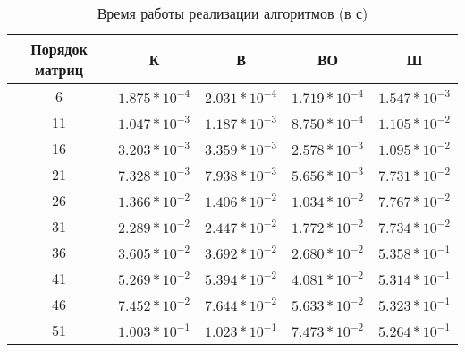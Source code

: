 \begin{table}[h]
	\begin{center}
		\begin{threeparttable}
			\captionsetup{justification=raggedright,singlelinecheck=off}
			\caption{Время работы реализации алгоритмов (в с)}
			\label{tbl:time_measurements}
			\begin{tabular}{|c|c|c|c|c|}
				\hline
				Порядок матриц &  К  & В & ВО & Ш \\
				\hline
			6 &$ 1.875* 10^{-4} $&$ 2.031* 10^{-4} $&$ 1.719* 10^{-4} $&$ 1.547* 10^{-3}$\\
			\hline
			11 &$ 1.047* 10^{-3} $&$ 1.187* 10^{-3} $&$ 8.750* 10^{-4} $&$ 1.105* 10^{-2}$\\
			\hline
			16 &$ 3.203* 10^{-3} $&$ 3.359* 10^{-3} $&$ 2.578* 10^{-3} $&$ 1.095* 10^{-2}$\\
			\hline
			21 &$ 7.328* 10^{-3} $&$ 7.938* 10^{-3} $&$ 5.656* 10^{-3} $&$ 7.731* 10^{-2}$\\
			\hline
			26 &$ 1.366* 10^{-2} $&$ 1.406* 10^{-2} $&$ 1.034* 10^{-2} $&$ 7.767* 10^{-2}$\\
			\hline
			31 &$ 2.289* 10^{-2} $&$ 2.447* 10^{-2} $&$ 1.772* 10^{-2} $&$ 7.734* 10^{-2}$\\
			\hline
			36 &$ 3.605* 10^{-2} $&$ 3.692* 10^{-2} $&$ 2.680* 10^{-2} $&$ 5.358* 10^{-1}$\\
			\hline
			41 &$ 5.269* 10^{-2} $&$ 5.394* 10^{-2} $&$ 4.081* 10^{-2} $&$ 5.314* 10^{-1}$\\
			\hline
			46 &$ 7.452* 10^{-2} $&$ 7.644* 10^{-2} $&$ 5.633* 10^{-2} $&$ 5.323* 10^{-1}$\\
			\hline
			51 &$ 1.003* 10^{-1} $&$ 1.023* 10^{-1} $&$ 7.473* 10^{-2} $&$ 5.264* 10^{-1}$\\
			\hline
			\end{tabular}
		\end{threeparttable}
	\end{center}
\end{table}

